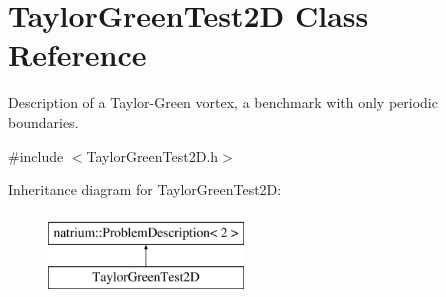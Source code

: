 \hypertarget{classTaylorGreenTest2D}{\section{Taylor\-Green\-Test2\-D Class Reference}
\label{classTaylorGreenTest2D}
}


Description of a Taylor-\/\-Green vortex, a benchmark with only periodic boundaries.  




{\ttfamily \#include $<$Taylor\-Green\-Test2\-D.\-h$>$}

Inheritance diagram for Taylor\-Green\-Test2\-D\-:\begin{figure}[H]
\begin{center}
\leavevmode
\includegraphics[height=2.000000cm]{classTaylorGreenTest2D}
\end{center}
\end{figure}
